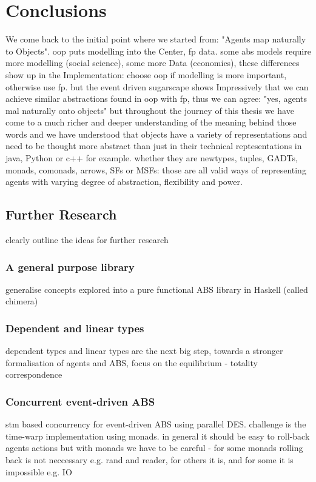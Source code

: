 \chapter{Conclusions}
\label{ch:conclusions}

We come back to the initial point where we started from: "Agents map naturally to Objects".
oop puts modelling into the Center, fp data. some abs models require more modelling (social science), some more Data (economics), these differences show up in the Implementation: choose oop if modelling is more important, otherwise use fp. but the event driven sugarscape shows Impressively that we can achieve similar abstractions found in oop with fp, thus we can agree: "yes, agents mal naturally onto objects" but throughout the journey of this thesis we have come to a much richer and deeper understanding of the meaning behind those words and we have understood that objects have a variety of representations and need to be thought more abstract than just in their technical reptesentations in java, Python or c++ for example. whether they are newtypes, tuples, GADTs, monads, comonads, arrows, SFs or MSFs: those are all valid ways of representing agents with varying degree of abstraction, flexibility and power. 


\section{Further Research}
clearly outline the ideas for further research

\subsection{A general purpose library}
generalise concepts explored into a pure functional ABS library in Haskell (called chimera)

\subsection{Dependent and linear types}
dependent types and linear types are the next big step, towards a stronger formalisation of agents and ABS,
focus on the equilibrium - totality correspondence

\subsection{Concurrent event-driven ABS}
stm based concurrency for event-driven ABS using parallel DES. challenge is the time-warp implementation using monads. in general it should be easy to roll-back agents actions but with monads we have to be careful - for some monads rolling back is not neccessary e.g. rand and reader, for others it is, and for some it is impossible e.g. IO